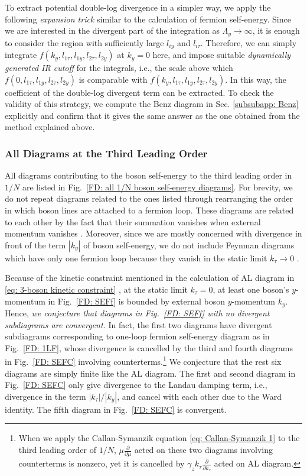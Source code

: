 \documentclass[prx,amsmath,amssymb, notitlepage, onecolumn,
nofootinbib,
superscriptaddress,
longbibliography
]{revtex4-1}
\newcommand{\ie}{{i.e., }}
\begin{document}
To extract potential double-log divergence in a simpler way, we apply the following {\it expansion trick} similar to the calculation of fermion self-energy. 
Since we are interested in the divergent part of the integration as $\Lambda_y\rightarrow\infty$, it is enough to consider the region with sufficiently large $l_{iy}$ and $l_{i\tau}$. 
Therefore, we can simply integrate $f(k_y, l_{1\tau}, l_{1y}, l_{2\tau}, l_{2y})$ 
at $k_y=0$ here, and impose suitable {\it dynamically generated IR  cutoff} for the integrals, \ie the scale above which $f(0, l_{1\tau}, l_{1y}, l_{2\tau}, l_{2y})$ is comparable with $f(k_y, l_{1\tau}, l_{1y}, l_{2\tau}, l_{2y})$. In this way, the coefficient of the double-log divergent term can be extracted. To check the validity of this strategy,
we compute the Benz diagram in Sec. \ref{subsubapp: Benz}
explicitly and confirm that it gives the same answer as the one obtained from the method  explained above.

\subsubsection{All Diagrams at the Third Leading Order}

All diagrams contributing to the boson self-energy
 to the third leading order in $1/N$ are listed in Fig.~\ref{FD: all 1/N boson self-energy diagrams}. 
For brevity, we do not repeat diagrams related to the ones listed through rearranging the order in which boson lines are attached to a fermion loop. 
These diagrams are related to each other by the fact that their summation vanishes when external momentum vanishes \cite{Holder2015}. Moreover, since we are mostly concerned with divergence in front of the term $|k_y|$ of boson self-energy, we do not include Feynman diagrams  which have only one fermion loop because they vanish in the static limit $k_\tau\rightarrow 0$ \cite{Lee2009,Metlitski2010}.

Because of the kinetic constraint mentioned in the calculation of AL diagram in \eqref{eq: 3-boson kinetic constraint} \cite{Holder2015b}, at the static limit $k_\tau=0$, at least one boson's $y$-momentum in Fig.~\ref{FD: SEFf} is bounded by external boson $y$-momentum $k_y$. 
Hence, {\it we conjecture that diagrams in Fig.~\ref{FD: SEFf} with no divergent subdiagrams are convergent.} 
In fact, the first two diagrams have divergent subdiagrams corresponding to one-loop fermion self-energy diagram as in Fig.~\ref{FD: 1LF}, whose divergence is cancelled by the third and fourth diagrams in Fig.~\ref{FD: SEFC} involving counterterms.\footnote{When we apply the Callan-Symanzik equation \eqref{eq: Callan-Symanzik 1} to the third leading order of $1/N$, $\mu \frac{\partial}{\partial \mu}$ acted on these two diagrams involving counterterms is nonzero, yet it is cancelled by $\gamma_z k_\tau\frac{\partial}{\partial k_\tau}$ acted on AL diagram.} 
%
We conjecture that the rest six diagrams are simply finite like the AL diagram. 
The first and second diagram in Fig.~\ref{FD: SEFC} only give divergence to the Landau damping term, \ie divergence in the term $|k_\tau|/|k_y|$, and cancel with each other due to the Ward identity. The fifth diagram in Fig.~\ref{FD: SEFC} is convergent.
\end{document}
